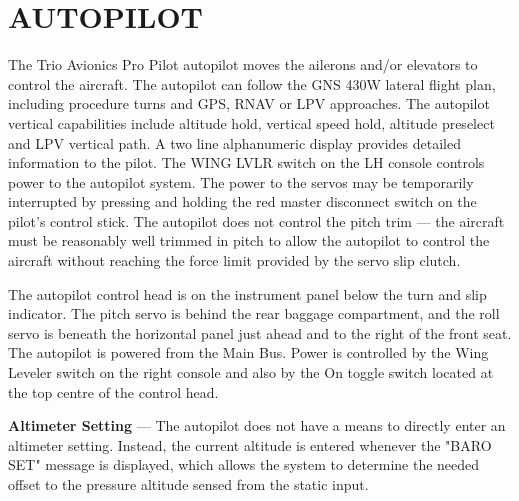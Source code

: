\section{AUTOPILOT} 

The Trio Avionics Pro Pilot autopilot moves the ailerons and/or elevators to control the aircraft. The autopilot can follow the GNS 430W lateral flight plan, including procedure turns and GPS, RNAV or LPV approaches. The autopilot vertical capabilities include altitude hold, vertical speed hold, altitude preselect and LPV vertical path. A two line alphanumeric display provides detailed information to the pilot. The WING LVLR switch on the LH console controls power to the autopilot system. The power to the servos may be temporarily interrupted by pressing and holding the red master disconnect switch on the pilot's control stick. The autopilot does not control the pitch trim --- the aircraft must be reasonably well trimmed in pitch to allow the autopilot to control the aircraft without reaching the force limit provided by the servo slip clutch. %

The autopilot control head is on the instrument panel below the turn and slip indicator. The pitch servo is behind the rear baggage compartment, and the roll servo is beneath the horizontal panel just ahead and to the right of the front seat. The autopilot is powered from the Main Bus. Power is controlled by the Wing Leveler switch on the right console and also by the On toggle switch located at the top centre of the control head.

\textbf{Altimeter Setting} --- The autopilot does not have a means to directly enter an altimeter setting. Instead, the current altitude is entered whenever the "BARO SET" message is displayed, which allows the system to determine the needed offset to the pressure altitude sensed from the static input.

